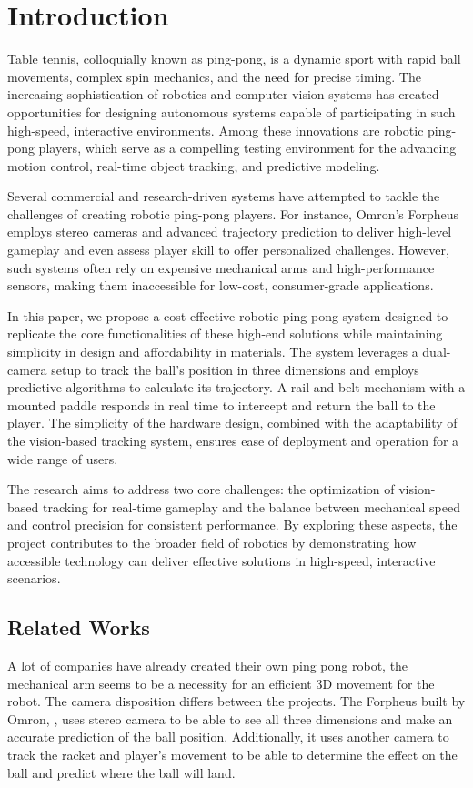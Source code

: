 \chapter{Introduction}

Table tennis, colloquially known as ping-pong, is a dynamic sport with rapid ball movements, complex spin mechanics, and the need for precise timing. The increasing sophistication of robotics and computer vision systems has created opportunities for designing autonomous systems capable of participating in such high-speed, interactive environments. Among these innovations are robotic ping-pong players, which serve as a compelling testing environment for the advancing motion control, real-time object tracking, and predictive modeling.

Several commercial and research-driven systems have attempted to tackle the challenges of creating robotic ping-pong players. For instance, Omron's Forpheus employs stereo cameras and advanced trajectory prediction to deliver high-level gameplay and even assess player skill to offer personalized challenges.\cite{Kyohei2019} However, such systems often rely on expensive mechanical arms and high-performance sensors, making them inaccessible for low-cost, consumer-grade applications.

In this paper, we propose a cost-effective robotic ping-pong system designed to replicate the core functionalities of these high-end solutions while maintaining simplicity in design and affordability in materials. The system leverages a dual-camera setup to track the ball's position in three dimensions and employs predictive algorithms to calculate its trajectory. A rail-and-belt mechanism with a mounted paddle responds in real time to intercept and return the ball to the player. The simplicity of the hardware design, combined with the adaptability of the vision-based tracking system, ensures ease of deployment and operation for a wide range of users.

The research aims to address two core challenges: the optimization of vision-based tracking for real-time gameplay and the balance between mechanical speed and control precision for consistent performance. By exploring these aspects, the project contributes to the broader field of robotics by demonstrating how accessible technology can deliver effective solutions in high-speed, interactive scenarios.

\section{Related Works}
A lot of companies have already created their own ping pong robot, the mechanical arm seems to be a necessity for an efficient 3D movement for the robot. The camera disposition differs between the projects. The Forpheus built by Omron, \cite{Kyohei2019}, uses stereo camera to be able to see all three dimensions and make an accurate prediction of the ball position. Additionally, it uses another camera to track the racket and player's movement to be able to determine the effect on the ball and predict where the ball will land.

